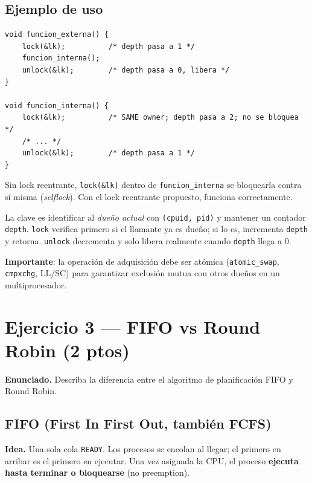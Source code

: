 \documentclass[11pt,a4paper]{article}
\begin{document}
\subsection*{Ejemplo de uso}

\begin{lstlisting}[style=cstyle]
void funcion_externa() {
    lock(&lk);          /* depth pasa a 1 */
    funcion_interna();
    unlock(&lk);        /* depth pasa a 0, libera */
}

void funcion_interna() {
    lock(&lk);          /* SAME owner; depth pasa a 2; no se bloquea */
    /* ... */
    unlock(&lk);        /* depth pasa a 1 */
}
\end{lstlisting}

Sin lock reentrante, \texttt{lock(\&lk)} dentro de
\texttt{funcion\_interna} se bloquearía contra sí misma
(\emph{selflock}). Con el lock reentrante propuesto, funciona
correctamente.

\begin{respuesta}
La clave es identificar al \emph{dueño actual} con \texttt{(cpuid,
pid)} y mantener un contador \texttt{depth}. \texttt{lock} verifica
primero si el llamante ya es dueño; si lo es, incrementa
\texttt{depth} y retorna. \texttt{unlock} decrementa y solo libera
realmente cuando \texttt{depth} llega a $0$.

\textbf{Importante}: la operación de adquisición debe ser atómica
(\texttt{atomic\_swap}, \texttt{cmpxchg}, LL/SC) para garantizar
exclusión mutua con otros dueños en un multiprocesador.
\end{respuesta}

\section{Ejercicio 3 --- FIFO vs Round Robin (2 ptos)}

\textbf{Enunciado.} Describa la diferencia entre el algoritmo de
planificación FIFO y Round Robin.

\subsection*{FIFO (First In First Out, también FCFS)}

\textbf{Idea.} Una sola cola \texttt{READY}. Los procesos se
encolan al llegar; el primero en arribar es el primero en ejecutar.
Una vez asignada la CPU, el proceso \textbf{ejecuta hasta terminar
o bloquearse} (no preemption).
\end{document}

